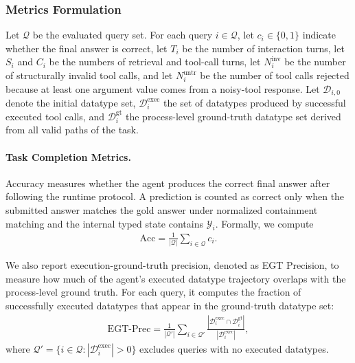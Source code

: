 \documentclass{llmxive}
\begin{document}
\subsubsection{Metrics Formulation}
\label{app:full-metric-definition}

Let $\mathcal{Q}$ be the evaluated query set. 
For each query $i \in \mathcal{Q}$, let $c_i \in \{0,1\}$ indicate whether the final answer is correct, let $T_i$ be the number of interaction turns, let $S_i$ and $C_i$ be the numbers of retrieval and tool-call turns, let $N_i^{\mathrm{inv}}$ be the number of structurally invalid tool calls, and let $N_i^{\mathrm{untr}}$ be the number of tool calls rejected because at least one argument value comes from a noisy-tool response.
Let $\mathcal{D}_{i,0}$ denote the initial datatype set, $\mathcal{D}_i^{\mathrm{exec}}$ the set of datatypes produced by successful executed tool calls, and $\mathcal{D}_i^{\mathrm{gt}}$ the process-level ground-truth datatype set derived from all valid paths of the task.

\paragraph{Task Completion Metrics.}
Accuracy measures whether the agent produces the correct final answer after following the runtime protocol. 
A prediction is counted as correct only when the submitted answer matches the gold answer under normalized containment matching and the internal typed state contains $\mathcal{Y}_i$.
Formally, we compute
\begin{equation}
\begin{aligned}
\mathrm{Acc} = \frac{1}{|\mathcal{Q}|}\sum_{i \in \mathcal{Q}} c_i.
\end{aligned}
\end{equation}

We also report execution-ground-truth precision, denoted as EGT Precision, to measure how much of the agent's executed datatype trajectory overlaps with the process-level ground truth. 
For each query, it computes the fraction of successfully executed datatypes that appear in the ground-truth datatype set:
\begin{equation}
\begin{aligned}
\mathrm{EGT\mbox{-}Prec} 
= \frac{1}{|\mathcal{Q}'|}\sum_{i \in \mathcal{Q}'}
\frac{|\mathcal{D}_i^{\mathrm{exec}} \cap \mathcal{D}_i^{\mathrm{gt}}|}
{|\mathcal{D}_i^{\mathrm{exec}}|},
\end{aligned}
\end{equation}
where $\mathcal{Q}'=\{i \in \mathcal{Q}: |\mathcal{D}_i^{\mathrm{exec}}|>0\}$ excludes queries with no executed datatypes.
\end{document}
